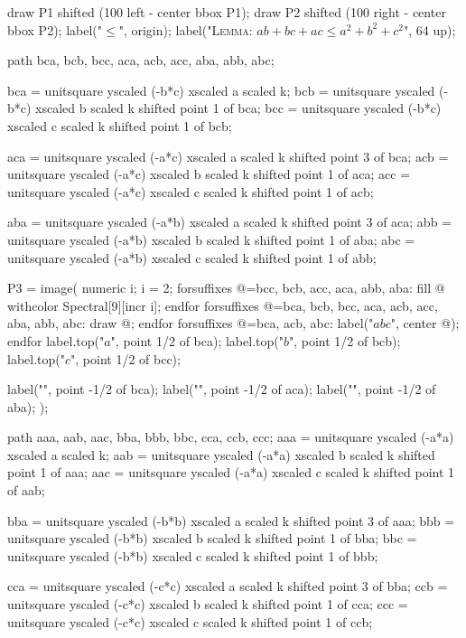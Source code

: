 \documentclass[oneside]{scrbook}
\begin{document}
draw P1 shifted (100 left  - center bbox P1);
draw P2 shifted (100 right - center bbox P2);
label("${}\le{}$", origin);
label("\textsc{Lemma}: $ab + bc + ac \le a^2 + b^2 + c^2$", 64 up);

path bca, bcb, bcc, aca, acb, acc, aba, abb, abc;

bca = unitsquare yscaled (-b*c) xscaled a scaled k; 
bcb = unitsquare yscaled (-b*c) xscaled b scaled k shifted point 1 of bca;
bcc = unitsquare yscaled (-b*c) xscaled c scaled k shifted point 1 of bcb;

aca = unitsquare yscaled (-a*c) xscaled a scaled k shifted point 3 of bca;
acb = unitsquare yscaled (-a*c) xscaled b scaled k shifted point 1 of aca;
acc = unitsquare yscaled (-a*c) xscaled c scaled k shifted point 1 of acb;

aba = unitsquare yscaled (-a*b) xscaled a scaled k shifted point 3 of aca;
abb = unitsquare yscaled (-a*b) xscaled b scaled k shifted point 1 of aba;
abc = unitsquare yscaled (-a*b) xscaled c scaled k shifted point 1 of abb;

P3 = image(
    numeric i; i = 2;
    forsuffixes @=bcc, bcb, acc, aca, abb, aba:
        fill @ withcolor Spectral[9][incr i];
    endfor
    forsuffixes @=bca, bcb, bcc, aca, acb, acc, aba, abb, abc:
        draw @;
    endfor
    forsuffixes @=bca, acb, abc:
        label("$abc$", center @);
    endfor
    label.top("$a$", point 1/2 of bca);
    label.top("$b$", point 1/2 of bcb);
    label.top("$c$", point 1/2 of bcc);

    label("", point -1/2 of bca);
    label("", point -1/2 of aca);
    label("", point -1/2 of aba);
);

path aaa, aab, aac, bba, bbb, bbc, cca, ccb, ccc;
aaa = unitsquare yscaled (-a*a) xscaled a scaled k; 
aab = unitsquare yscaled (-a*a) xscaled b scaled k shifted point 1 of aaa; 
aac = unitsquare yscaled (-a*a) xscaled c scaled k shifted point 1 of aab;

bba = unitsquare yscaled (-b*b) xscaled a scaled k shifted point 3 of aaa;
bbb = unitsquare yscaled (-b*b) xscaled b scaled k shifted point 1 of bba;
bbc = unitsquare yscaled (-b*b) xscaled c scaled k shifted point 1 of bbb;

cca = unitsquare yscaled (-c*c) xscaled a scaled k shifted point 3 of bba;
ccb = unitsquare yscaled (-c*c) xscaled b scaled k shifted point 1 of cca;
ccc = unitsquare yscaled (-c*c) xscaled c scaled k shifted point 1 of ccb;
\end{document}
